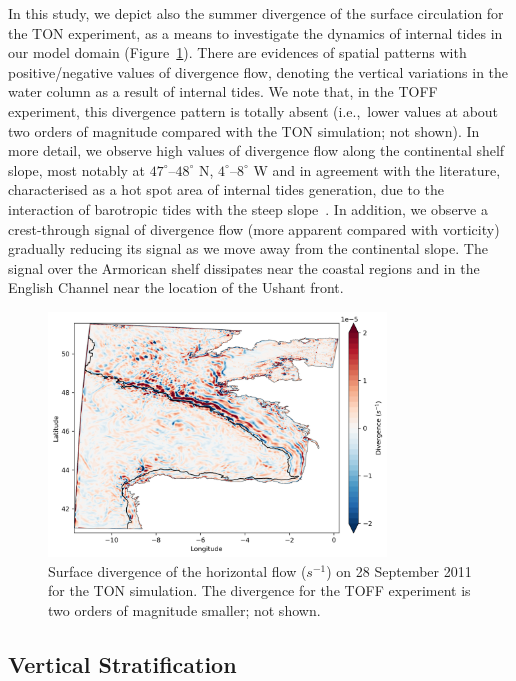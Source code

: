 \documentclass[jmse,article,accept,moreauthors,pdftex]{Definitions/mdpi}
\begin{document}
In this study, we depict also the summer divergence of the surface circulation for the TON experiment, as a means to investigate the dynamics of internal tides in our model domain (Figure~\ref{fig:divergence}). There are evidences of spatial patterns with positive/negative values of divergence flow, denoting the vertical variations in the water column as a result of internal tides. We note that, in the TOFF experiment, this divergence pattern is totally absent (i.e.,~lower values at about two orders of magnitude compared with the TON simulation; not shown). In more detail, we observe high values of divergence flow along the continental shelf slope, most notably at $47^\circ${--}$48^\circ$ N, 
$4^\circ${--}$8^\circ$ W and in agreement with the literature, characterised as a hot spot area of internal tides generation, due to the interaction of barotropic tides with the steep slope~\cite{Pingree1986,PINGREE1995,Pichon2006,Pairaud2010}. In addition, we observe a crest-through signal of divergence flow (more apparent compared with vorticity) gradually reducing its signal as we move away from the continental slope. The signal over the Armorican shelf dissipates near the coastal regions and in the English Channel near the location of the Ushant front.

\begin{figure}[H]
    \centering
    \includegraphics[width=0.8\textwidth]{Definitions/figure8.png}
    \caption{Surface divergence of the horizontal flow ($s^{-1}$) on 28 September 2011 for the TON simulation. The divergence for the TOFF experiment is two orders of magnitude smaller; not shown.}
    \label{fig:divergence}
\end{figure}

\subsection{Vertical Stratification}
\label{section:3.3}
\end{document}
